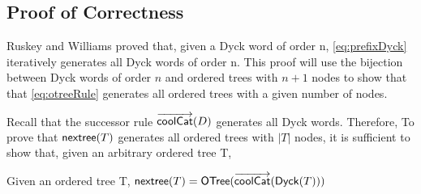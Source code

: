 \subsection{Proof of Correctness} 




Ruskey and Williams proved that, given a Dyck word of order n, \ref{eq:prefixDyck} iteratively generates all Dyck words of order n.  This proof will use the bijection between Dyck words of order $n$ and ordered trees with $n+1$ nodes to show that that \ref{eq:otreeRule} generates all ordered trees with a given number of nodes.  

Recall that the successor rule $\overrightarrow{\mathsf{coolCat}}{(D)}$ generates all Dyck words.  Therefore,  To prove that $\mathsf{nextree}{(T)}$ generates all ordered trees with $|T|$ nodes, it is sufficient to show that, given an arbitrary ordered tree T, 

\begin{theorem}
    Given an ordered tree T, $\mathsf{nextree}{(T)}=\mathsf{OTree}{(\overrightarrow{\mathsf{coolCat}}{(\mathsf{Dyck}{(T)})})}$
\end{theorem}

